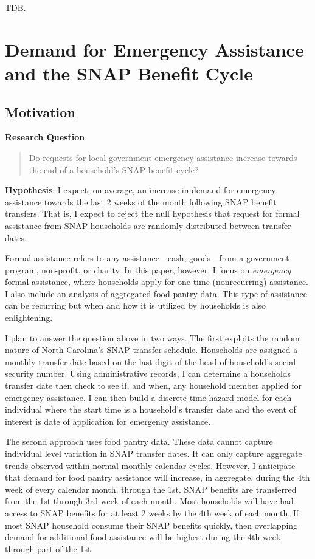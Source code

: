 \documentclass[12pt,letterpaperpaper,]{book}
\begin{document}
TDB.

\chapter{Demand for Emergency Assistance and the SNAP Benefit
Cycle}\label{chapter-3}

\section*{Motivation}\label{motivation-2}

\textbf{Research Question}

\begin{quote}
Do requests for local-government emergency assistance increase towards
the end of a household's SNAP benefit cycle?
\end{quote}

\textbf{Hypothesis}: I expect, on average, an increase in demand for
emergency assistance towards the last 2 weeks of the month following
SNAP benefit transfers. That is, I expect to reject the null hypothesis
that request for formal assistance from SNAP households are randomly
distributed between transfer dates.

Formal assistance refers to any assistance---cash, goods---from a
government program, non-profit, or charity. In this paper, however, I
focus on \emph{emergency} formal assistance, where households apply for
one-time (nonrecurring) assistance. I also include an analysis of
aggregated food pantry data. This type of assistance can be recurring
but when and how it is utilized by households is also enlightening.

I plan to answer the question above in two ways. The first exploits the
random nature of North Carolina's SNAP transfer schedule. Households are
assigned a monthly transfer date based on the last digit of the head of
household's social security number. Using administrative records, I can
determine a households transfer date then check to see if, and when, any
household member applied for emergency assistance. I can then build a
discrete-time hazard model for each individual where the start time is a
household's transfer date and the event of interest is date of
application for emergency assistance.

The second approach uses food pantry data. These data cannot capture
individual level variation in SNAP transfer dates. It can only capture
aggregate trends observed within normal monthly calendar cycles.
However, I anticipate that demand for food pantry assistance will
increase, in aggregate, during the 4th week of every calendar month,
through the 1st. SNAP benefits are transferred from the 1st through 3rd
week of each month. Most households will have had access to SNAP
benefits for at least 2 weeks by the 4th week of each month. If most
SNAP household consume their SNAP benefits quickly, then overlapping
demand for additional food assistance will be highest during the 4th
week through part of the 1st.
\end{document}
